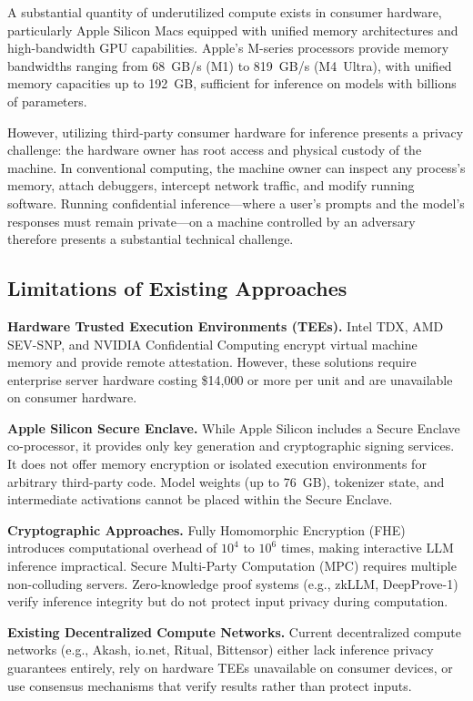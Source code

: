 \documentclass[11pt,letterpaper]{article}
\begin{document}
A substantial quantity of underutilized compute exists in consumer hardware, particularly Apple Silicon Macs equipped with unified memory architectures and high-bandwidth GPU capabilities. Apple's M-series processors provide memory bandwidths ranging from 68~GB/s (M1) to 819~GB/s (M4~Ultra), with unified memory capacities up to 192~GB, sufficient for inference on models with billions of parameters.

However, utilizing third-party consumer hardware for inference presents a privacy challenge: the hardware owner has root access and physical custody of the machine. In conventional computing, the machine owner can inspect any process's memory, attach debuggers, intercept network traffic, and modify running software. Running confidential inference---where a user's prompts and the model's responses must remain private---on a machine controlled by an adversary therefore presents a substantial technical challenge.

\subsection{Limitations of Existing Approaches}

\textbf{Hardware Trusted Execution Environments (TEEs).} Intel TDX, AMD SEV-SNP, and NVIDIA Confidential Computing encrypt virtual machine memory and provide remote attestation. However, these solutions require enterprise server hardware costing \$14,000 or more per unit and are unavailable on consumer hardware.

\textbf{Apple Silicon Secure Enclave.} While Apple Silicon includes a Secure Enclave co-processor, it provides only key generation and cryptographic signing services. It does not offer memory encryption or isolated execution environments for arbitrary third-party code. Model weights (up to 76~GB), tokenizer state, and intermediate activations cannot be placed within the Secure Enclave.

\textbf{Cryptographic Approaches.} Fully Homomorphic Encryption (FHE) introduces computational overhead of $10^4$ to $10^6$ times, making interactive LLM inference impractical. Secure Multi-Party Computation (MPC) requires multiple non-colluding servers. Zero-knowledge proof systems (e.g., zkLLM, DeepProve-1) verify inference integrity but do not protect input privacy during computation.

\textbf{Existing Decentralized Compute Networks.} Current decentralized compute networks (e.g., Akash, io.net, Ritual, Bittensor) either lack inference privacy guarantees entirely, rely on hardware TEEs unavailable on consumer devices, or use consensus mechanisms that verify results rather than protect inputs.
\end{document}
